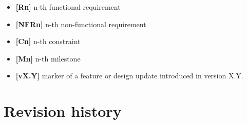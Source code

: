 \documentclass[11pt,a4paper,oneside]{report}
\providecommand{\tightlist}{\setlength{\itemsep}{0pt}\setlength{\parskip}{0pt}}
\begin{document}
\begin{itemize}
\tightlist
\item
  \textbf{{[}Rn{]}} n-th functional requirement
\item
  \textbf{{[}NFRn{]}} n-th non-functional requirement
\item
  \textbf{{[}Cn{]}} n-th constraint 
\item
  \textbf{{[}Mn{]}} n-th milestone
\item \textbf{[vX.Y]} marker of a feature or design
update introduced in version X.Y.
\end{itemize}

\hypertarget{revision-history}{%
\section{Revision history}\label{revision-history}}
\end{document}
